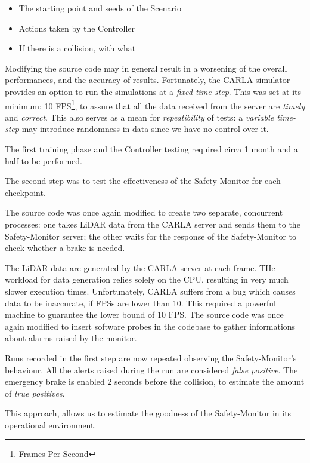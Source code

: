 \begin{itemize}
	\item The starting point and seeds of the Scenario
	\item Actions taken by the Controller
	\item If there is a collision, with what
\end{itemize}

Modifying the source code may in general result in a worsening of the overall performances, and the accuracy of results. Fortunately, the CARLA simulator provides an option to run the simulations at a \textsl{fixed-time step}. This was set at its minimum: 10 FPS\footnote{Frames Per Second}, to assure that all the data received from the server are \textsl{timely} and \textsl{correct}. This also serves as a mean for \textsl{repeatibility} of tests: a \textsl{variable time-step} may introduce randomness in data since we have no control over it.

The first training phase and the Controller testing required circa 1 month and a half to be performed.\newline

The second step was to test the effectiveness of the Safety-Monitor for each checkpoint.

The source code was once again modified to create two separate, concurrent processes: one takes LiDAR data from the CARLA server and sends them to the Safety-Monitor server; the other waits for the response of the Safety-Monitor to check whether a brake is needed.

The LiDAR data are generated by the CARLA server at each frame. THe workload for data generation relies solely on the CPU, resulting in very much slower execution times. Unfortunately, CARLA suffers from a bug which causes data to be inaccurate, if FPSs are lower than 10. This required a powerful machine to guarantee the lower bound of 10 FPS.
The source code was once again modified to insert software probes in the codebase to gather informations about alarms raised by the monitor.

Runs recorded in the first step are now repeated observing the Safety-Monitor's behaviour. All the alerts raised during the run are considered \textsl{false positive}. The emergency brake is enabled 2 seconds before the collision, to estimate the amount of \textsl{true positives}.

This approach, allows us to estimate the goodness of the Safety-Monitor in its operational environment.\newline

